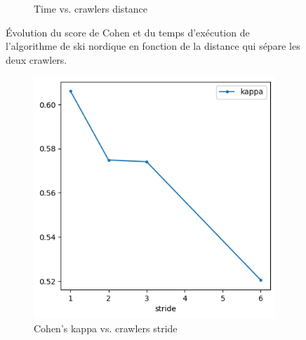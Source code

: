 \documentclass[francais,RandD]{rapportPFE}
\begin{document}
\begin{figure}[h!]
\begin{subfigure}[t]{0.49\linewidth}
					\caption{Time vs. crawlers distance}
					\label{fig:ski_nordique-time_vs_distance}
			\end{subfigure}
			\caption{Évolution du score de Cohen et du temps d'exécution de l'algorithme de ski nordique en fonction de la distance qui sépare les deux crawlers.}
			\label{fig:ski_nordique-distance}
		\end{figure}

		\begin{figure}[h!]
			\begin{subfigure}[t]{0.49\linewidth}
				\includegraphics[width=\linewidth]{graphics/ski_nordique-kappa_vs_stride.png}
				\caption{Cohen's kappa vs. crawlers stride}
				\label{fig:ski_nordique-kappa_vs_stride}
			\end{subfigure}
			\hfill
			\begin{subfigure}[t]{0.49\linewidth}

\end{subfigure}
\end{figure}
\end{document}
